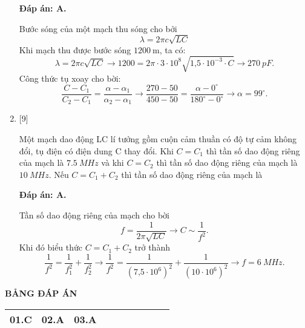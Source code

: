 \begin{enumerate}[label=\bfseries Câu \arabic*:]
	\loigiai
	{		\textbf{Đáp án: A.}
		
Bước sóng của một mạch thu sóng cho bởi
$$
\lambda=2 \pi c \sqrt{L C}
$$
Khi mạch thu được bước sóng $1200 \mathrm{~m}$, ta có:
$$
\lambda=2 \pi c \sqrt{L C} \rightarrow 1200=2 \pi \cdot 3\cdot10^{8} \sqrt{\text{1,5}\cdot10^{-3} \cdot C} \rightarrow \SI{270}{pF}.
$$
Công thức tụ xoay cho bời:
$$
\dfrac{C-C_{1}}{C_{2}-C_{1}}=\dfrac{\alpha-\alpha_{1}}{\alpha_{2}-\alpha_{1}} \rightarrow \dfrac{270-50}{450-50}=\dfrac{\alpha-0^{\circ}}{180^{\circ}-0^{\circ}} \rightarrow \alpha=99^{\circ}.
$$
		
	}


	\item {} [9] 
	
	\cauhoi
	{Một mạch dao động LC lí tưởng gồm cuộn cảm thuần có độ tự cảm không đổi, tụ điện có điện dung C thay đổi. Khi $C = C_1$ thì tần số dao động riêng của mạch là $\SI{7,5}{MHz}$ và khi $C = C_2$ thì tần số dao động riêng của mạch là $\SI{10}{MHz}$. Nếu $C = C_1 + C_2$ thì tần số dao động riêng của mạch là
	}
	
	\loigiai
	{		\textbf{Đáp án: A.}
		
Tần số dao động riêng của mạch cho bời
$$
f=\dfrac{1}{2 \pi \sqrt{L C}} \rightarrow C \sim \dfrac{1}{f^{2}}.
$$
Khi đó biểu thức $C=C_{1}+C_{2}$ trở thành
$$
\dfrac{1}{f^{2}}=\dfrac{1}{f_{1}^{2}}+\dfrac{1}{f_{2}^{2}} \rightarrow \dfrac{1}{f^{2}}=\dfrac{1}{\left(\text{7,5}\cdot10^{6}\right)^{2}}+\dfrac{1}{\left(10\cdot10^{6}\right)^{2}} \rightarrow f = \SI{6}{MHz}.
$$
	
	}

\end{enumerate}

\loigiai
{
	\begin{center}
		\textbf{BẢNG ĐÁP ÁN}
	\end{center}
	\begin{center}
		\begin{tabular}{|m{2.8em}|m{2.8em}|m{2.8em}|m{2.8em}|m{2.8em}|m{2.8em}|m{2.8em}|m{2.8em}|m{2.8em}|m{2.8em}|}
			\hline
			01.C  & 02.A  & 03.A  &   &   &   &  &  &  &  \\
			\hline
			
		\end{tabular}
	\end{center}
}

